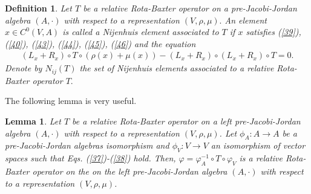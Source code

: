 \documentclass[12pt]{amsart}
\newtheorem{definition}[Theorem]{Definition}
\newtheorem{lemma}[Theorem]{Lemma}
\begin{document}
\begin{definition}
	Let $T$ be a relative Rota-Baxter operator on a pre-Jacobi-Jordan algebra $(A,\cdot )$ with 
	respect to a representation $(V, \rho,\mu ).$ An element $x\in C^0(V,A)$ is called a Nijenhuis element associated to $T$ if $x$ satisfies (\ref{39}), (\ref{40}), (\ref{43}), (\ref{44}), (\ref{45}), (\ref{46}) and the equation
	\begin{eqnarray}
	(L_x+R_x)\circ T\circ (\rho(x)+\mu(x))-(L_x+R_x)\circ (L_x+R_x)\circ T=0.
	\label{O1}
	\end{eqnarray}
Denote by $N_{ij}(T )$ the set of Nijenhuis elements associated to a relative Rota-Baxter operator $T.$
\end{definition}
The following lemma is very useful.
\begin{lemma}\label{LemT2}
 Let $T$ be a relative Rota-Baxter operator on a left pre-Jacobi-Jordan algebra $(A,\cdot)$ with
 respect to a representation $(V,\rho,\mu)$. 
 Let $\phi_A: A\rightarrow A$ be a pre-Jacobi-Jordan algebras isomorphism and $\phi_V: V\rightarrow V$
  an isomorphism of vector spaces such that Eqs.
  (\ref{37})-(\ref{38}) hold. Then, 
  $	\varphi=\varphi_A^{-1}\circ T\circ\varphi_V$ 
is a relative Rota-Baxter operator on the on the left pre-Jacobi-Jordan algebra $(A,\cdot)$ with
respect to a representation $(V,\rho,\mu)$.
\end{lemma}
\end{document}
